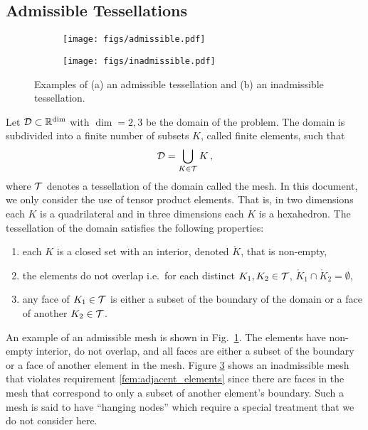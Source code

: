 \documentclass[../doc.tex]{subfiles}
\begin{document}
\subsection{Admissible Tessellations}
\begin{figure}
\centering
\begin{subfigure}{.45\textwidth}
	\centering
	\texttt{[image: figs/admissible.pdf]}
	\caption{}
	\label{fem:admissible}
\end{subfigure}
\begin{subfigure}{.45\textwidth}
	\centering
	\texttt{[image: figs/inadmissible.pdf]}
	\caption{}
	\label{fem:inadmissible}
\end{subfigure}
\caption{Examples of (a) an admissible tessellation and (b) an inadmissible tessellation.}
\end{figure}

Let $\mathcal{D} \subset \mathbb{R}^{\dim}$ with $\dim = 2,3$ be the domain of the problem. The domain is subdivided into a finite number of subsets $K$, called finite elements, such that 
	\begin{equation}
		\mathcal{D} = \bigcup_{K \in \mathcal{T}} K \,, 
	\end{equation}
where $\mathcal{T}$ denotes a tessellation of the domain called the mesh. 
In this document, we only consider the use of tensor product elements. That is, in two dimensions each $K$ is a quadrilateral and in three dimensions each $K$ is a hexahedron. The tessellation of the domain satisfies the following properties: 
	\begin{enumerate}
		\item each $K$ is a closed set with an interior, denoted $\mathring{K}$, that is non-empty, 
		\item the elements do not overlap i.e.~for each distinct $K_1,K_2 \in \mathcal{T}$, $\mathring{K}_1 \cap \mathring{K}_2 = \emptyset$,
		\item \label{fem:adjacent_elements}any face of $K_1 \in \mathcal{T}$ is either a subset of the boundary of the domain or a face of another $K_2 \in \mathcal{T}$.  
	\end{enumerate}
An example of an admissible mesh is shown in Fig.~\ref{fem:admissible}. The elements have non-empty interior, do not overlap, and all faces are either a subset of the boundary or a face of another element in the mesh. Figure \ref{fem:inadmissible} shows an inadmissible mesh that violates requirement \ref{fem:adjacent_elements} since there are faces in the mesh that correspond to only a subset of another element's boundary. Such a mesh is said to have ``hanging nodes'' which require a special treatment that we do not consider here. 
\end{document}
